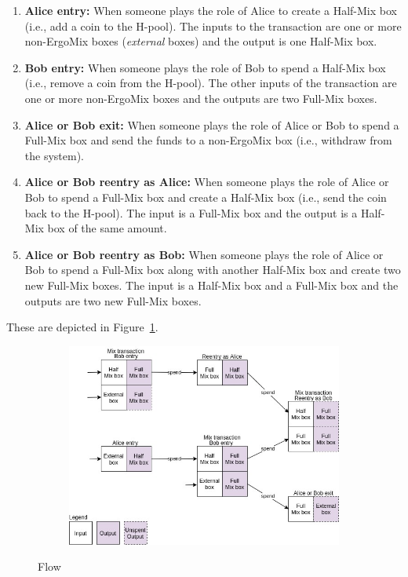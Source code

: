 \documentclass[runningheads]{llncs}
\newcommand{\mixname}{ErgoMix\xspace}
\begin{document}
\begin{enumerate}
    \item \textbf{Alice entry:} When someone plays the role of Alice to create a Half-Mix box (i.e., add a coin to the H-pool). The inputs to the transaction are one or more non-\mixname boxes ({\em external} boxes) and the output is one Half-Mix box. 
    \item \textbf{Bob entry:} When someone plays the role of Bob to spend a Half-Mix box (i.e., remove a coin from the H-pool). The other inputs of the transaction are one or more non-\mixname boxes and the outputs are two Full-Mix boxes. 
    \item \textbf{Alice or Bob exit:} When someone plays the role of Alice or Bob to spend a Full-Mix box and send the funds to a non-\mixname box (i.e., withdraw from the system). 
    \item \textbf{Alice or Bob reentry as Alice:} When someone plays the role of Alice or Bob to spend a Full-Mix box and create a Half-Mix box (i.e., send the coin back to the H-pool). The input is a Full-Mix box and the output is a Half-Mix box of the same amount.
    \item \textbf{Alice or Bob reentry as Bob:} When someone plays the role of Alice or Bob to spend a Full-Mix box along with another Half-Mix box and create two new Full-Mix boxes. The input is a Half-Mix box and a Full-Mix box and the outputs are two new Full-Mix boxes.
\end{enumerate}

These are depicted in Figure~\ref{fig:ergomixflow}.

\begin{figure}[h]
	\centering
	\begin{subfigure}{0.7\textwidth}
		\centering
		\includegraphics[width=\linewidth]{ErgoMixFlow.jpg}
	\end{subfigure}
	\caption{\algname Flow}
\label{fig:ergomixflow}
\end{figure}
\end{document}
